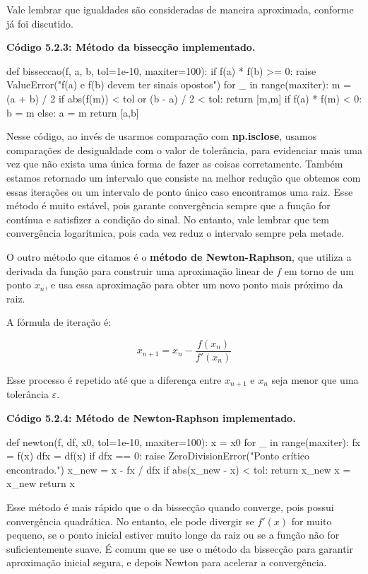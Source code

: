 \documentclass[11pt, a4paper]{article}
\begin{document}
Vale lembrar que igualdades são consideradas de maneira aproximada, conforme já foi discutido.

\textbf{Código 5.2.3: Método da bissecção implementado.}

\begin{code}
def bisseccao(f, a, b, tol=1e-10, maxiter=100):
    if f(a) * f(b) >= 0:
        raise ValueError("f(a) e f(b) devem ter sinais opostos")
    for _ in range(maxiter):
        m = (a + b) / 2
        if abs(f(m)) < tol or (b - a) / 2 < tol:
            return [m,m]
        if f(a) * f(m) < 0:
            b = m
        else:
            a = m
    return [a,b]
\end{code}

Nesse código, ao invés de usarmos comparação com \textbf{np.isclose}, usamos comparações de desigualdade com o valor de tolerância, para evidenciar mais uma vez que não exista uma única forma de fazer as coisas corretamente. Também estamos retornado um intervalo que consiste na melhor redução que obtemos com essas iterações ou um intervalo de ponto único caso encontramos uma raiz. Esse método é muito estável, pois garante convergência sempre que a função for contínua e satisfizer a condição do sinal. No entanto, vale lembrar que tem convergência logarítmica, pois cada vez reduz o intervalo sempre pela metade.

O outro método que citamos é o \textbf{método de Newton-Raphson}, que utiliza a derivada da função para construir uma aproximação linear de \( f \) em torno de um ponto \( x_n \), e usa essa aproximação para obter um novo ponto mais próximo da raiz.

A fórmula de iteração é:

\[
x_{n+1} = x_n - \frac{f(x_n)}{f'(x_n)}
\]

Esse processo é repetido até que a diferença entre \( x_{n+1} \) e \( x_n \) seja menor que uma tolerância \(\varepsilon\).

\textbf{Código 5.2.4: Método de Newton-Raphson implementado.}

\begin{code}
def newton(f, df, x0, tol=1e-10, maxiter=100):
    x = x0
    for _ in range(maxiter):
        fx = f(x)
        dfx = df(x)
        if dfx == 0:
            raise ZeroDivisionError("Ponto crítico encontrado.")
        x_new = x - fx / dfx
        if abs(x_new - x) < tol:
            return x_new
        x = x_new
    return x
\end{code}

Esse método é mais rápido que o da bissecção quando converge, pois possui convergência quadrática. No entanto, ele pode divergir se \( f'(x) \) for muito pequeno, se o ponto inicial estiver muito longe da raiz ou se a função não for suficientemente suave. É comum que se use o método da bissecção para garantir aproximação inicial segura, e depois Newton para acelerar a convergência.
\end{document}
